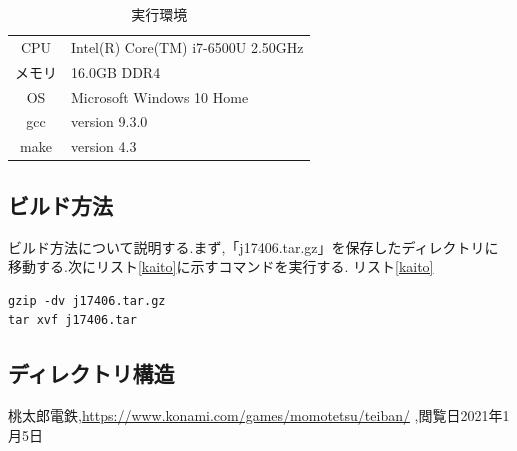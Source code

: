\documentclass[a4j]{jarticle}
\begin{document}
      \begin{table}[H]
        \caption{実行環境}
      \label{env}
      \begin{center}
          \begin{tabular}{c|l}\hline
            CPU & Intel(R) Core(TM) i7-6500U 2.50GHz  \\ 
            メモリ & 16.0GB DDR4 \\
            OS & Microsoft Windows 10 Home \\
            gcc &  version 9.3.0 \\
            make & version 4.3 \\ \hline
          \end{tabular}
      \end{center}
      \end{table}
      
      \subsection{ビルド方法}
      ビルド方法について説明する.まず,「j17406.tar.gz」を保存したディレクトリに移動する.次にリスト\ref{kaito}に示すコマンドを実行する.
      リスト\ref{kaito}
      \begin{lstlisting}[basicstyle=\ttfamily\footnotesize, frame=single,label=kaito,caption=j17406.tar.gzの解凍]
gzip -dv j17406.tar.gz
tar xvf j17406.tar
        \end{lstlisting}
      
      \subsection{ディレクトリ構造}

    \begin{thebibliography}{9}
          桃太郎電鉄,\url{https://www.konami.com/games/momotetsu/teiban/} ,閲覧日2021年1月5日
        \end{thebibliography}
\end{document}
